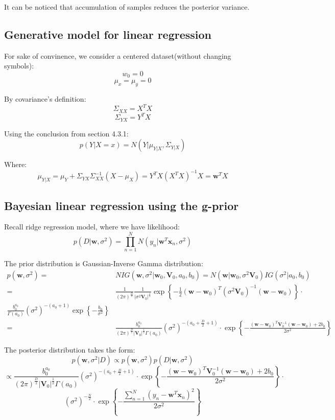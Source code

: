 \documentclass[UTF8]{ctexart}
\begin{document}
It can be noticed that accumulation of samples reduces the posterior variance.

\subsection{Generative model for linear regression}
For sake of convinence, we consider a centered dataset(without changing symbols):
$$w_{0}=0$$
$$\mu_{x}=\mu_{y}=0$$

By covariance's definition:
$$\Sigma_{XX}=X^{T}X$$
$$\Sigma_{YX}=Y^{T}X$$

Using the conclusion from section 4.3.1:
$$p(Y|X=x)=N(Y|\mu_{Y|X},\Sigma_{Y|X})$$

Where:
$$\mu_{Y|X}=\mu_{Y}+\Sigma_{YX}\Sigma_{XX}^{-1}(X-\mu_{X})=Y^{T}X(X^{T}X)^{-1}X=\textbf{w}^{T}X$$

\subsection{Bayesian linear regression using the g-prior}
Recall ridge regression model, where we have likelihood:
$$p(D|\textbf{w},\sigma^{2})=\prod_{n=1}^{N}N(y_{n}|\textbf{w}^{T}\textbf{x}_{n},\sigma^{2})$$

The prior distribution is Gaussian-Inverse Gamma distribution:
\begin{align}
p(\textbf{w},\sigma^{2})=&NIG(\textbf{w},\sigma^{2}|\textbf{w}_{0},\textbf{V}_{0},a_{0},b_{0})=N(\textbf{w}|\textbf{w}_{0},\sigma^{2}\textbf{V}_{0})IG(\sigma^{2}|a_{0},b_{0})\nonumber \\
=&\frac{1}{(2\pi)^{\frac{D}{2}}}\frac{1}{|\sigma^{2}\textbf{V}_{0}|^{\frac{1}{2}}}\exp\left\{ -\frac{1}{2}(\textbf{w}-\textbf{w}_{0})^{T}(\sigma^{2}\textbf{V}_{0})^{-1}(\textbf{w}-\textbf{w}_{0}) \right\} \cdot\nonumber \\
\frac{b_{0}^{a_{0}}}{\Gamma(a_{0})}(\sigma^{2})^{-(a_{0}+1)}\exp\left\{ -\frac{b_{0}}{\sigma^{2}} \right\}\nonumber \\
=&\frac{b_{0}^{a_{0}}}{(2\pi)^{\frac{D}{2}}|\textbf{V}_{0}|^{\frac{1}{2}}\Gamma(a_{0})}(\sigma^{2})^{-(a_{0}+\frac{D}{2}+1)}\cdot\exp\left\{ -\frac{(\textbf{w}-\textbf{w}_{0})^{T}\textbf{V}_{0}^{-1}(\textbf{w}-\textbf{w}_{0})+2b_{0}}{2\sigma^{2}} \right\}\nonumber
\end{align}

The posterior distribution takes the form:
$$p(\textbf{w},\sigma^{2}|D) \propto p(\textbf{w},\sigma^{2})p(D|\textbf{w},\sigma^{2})$$
$$\propto \frac{b_{0}^{a_{0}}}{(2\pi)^{\frac{D}{2}}|\textbf{V}_{0}|^{\frac{1}{2}}\Gamma(a_{0})}(\sigma^{2})^{-(a_{0}+\frac{D}{2}+1)}\cdot\exp\left\{ -\frac{(\textbf{w}-\textbf{w}_{0})^{T}\textbf{V}_{0}^{-1}(\textbf{w}-\textbf{w}_{0})+2b_{0}}{2\sigma^{2}} \right\} \cdot$$
$$(\sigma^{2})^{-\frac{N}{2}}\cdot \exp\left\{ -\frac{\sum_{n=1}^{N}(y_{n}-\textbf{w}^{T}\textbf{x}_{n})^{2}}{2\sigma^{2}}  \right\}$$
\end{document}
